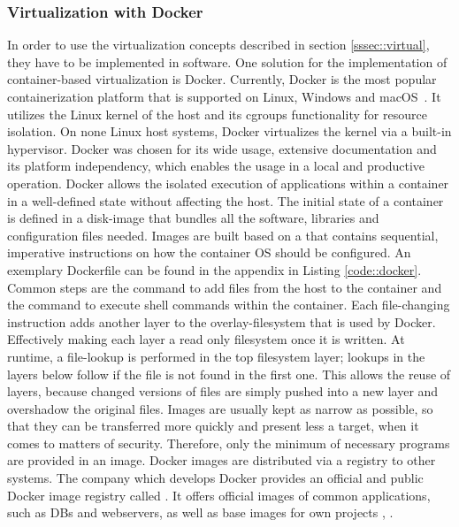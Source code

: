         \subsubsection{Virtualization with Docker}\label{sssec::docker}
        In order to use the virtualization concepts described in section \ref{sssec::virtual}, they have to be implemented in software. One solution for the implementation of container-based virtualization is Docker. Currently, Docker is the most popular containerization platform that is supported on Linux, Windows and macOS~\cite{docker_share}. It utilizes the Linux kernel of the host and its cgroups functionality for resource isolation. On none Linux host systems, Docker virtualizes the kernel via a built-in hypervisor. Docker was chosen for its wide usage, extensive documentation and its platform independency, which enables the usage in a local and productive operation.\newline
        Docker allows the isolated execution of applications within a container in a well-defined state without affecting the host. The initial state of a container is defined in a disk-image that bundles all the software, libraries and configuration files needed. Images are built based on a  that contains sequential, imperative instructions on how the container \ac{OS} should be configured. An exemplary Dockerfile can be found in the appendix in Listing \ref{code::docker}. Common steps are the  command to add files from the host to the container and the  command to execute shell commands within the container. Each file-changing instruction adds another layer to the overlay-filesystem that is used by Docker. Effectively making each layer a read only filesystem once it is written. At runtime, a file-lookup is performed in the top filesystem layer; lookups in the layers below follow if the file is not found in the first one. This allows the reuse of layers, because changed versions of files are simply pushed into a new layer and overshadow the original files. Images are usually kept as narrow as possible, so that they can be transferred more quickly and  present less a target, when it comes to matters of security. Therefore, only the minimum of necessary programs are provided in an image. Docker images are distributed via a registry to other systems. The company which develops Docker provides an official and public Docker image registry called . It offers official images of common applications, such as \acl{DB}s and webservers, as well as base images for own projects \cite{docker2020}, \cite{dockerdocs}.\newpage
